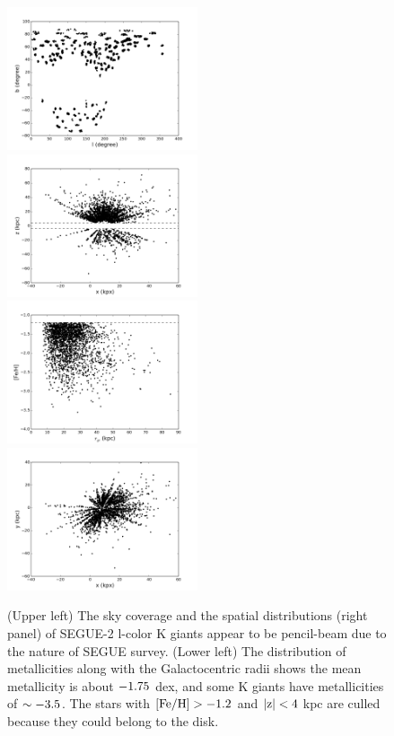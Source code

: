 \documentclass[12pt,preprint]{aastex}
\newcommand{\feh}{{\rm [Fe/H]}}
\begin{document}
\begin{figure}
\includegraphics[width=0.5\textwidth,height=0.3\textheight]{skymap_lkg}
\includegraphics[width=0.5\textwidth,height=0.3\textheight]{xz_lkg}
\includegraphics[width=0.5\textwidth,height=0.3\textheight]{rgcfeh_lkg}
\includegraphics[width=0.5\textwidth,height=0.3\textheight]{xy_lkg}
\caption{(Upper left) The sky coverage and the spatial distributions (right panel) of SEGUE-2 l-color K giants appear to be pencil-beam due to the nature of SEGUE survey. (Lower left) The distribution of metallicities along with the Galactocentric radii shows the mean metallicity is about $\rm -1.75~$dex, and some K giants have metallicities of $\rm \sim -3.5$. The stars with $\rm \feh>-1.2$ and $\rm |z|<4~$kpc are culled because they could belong to the disk.}
\label{f:fkgdistribution}
\end{figure}
\end{document}
